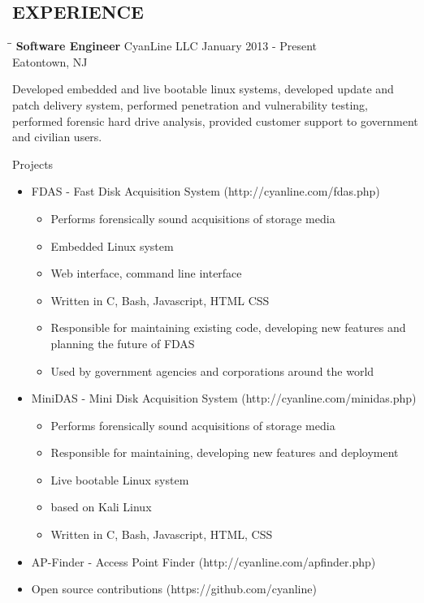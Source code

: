 \documentclass{res}
\begin{document}
\begin{resume}
\section{EXPERIENCE}
   \vspace{-0.1in}	
   \begin{tabbing}
   \hspace{2.3in}\= \hspace{2.6in}\= \kill %
    {\bf Software Engineer} \>CyanLine LLC     \>January 2013 - Present\\
                             \>Eatontown, NJ
   \end{tabbing}\vspace{-20pt}      %
    Developed embedded and live bootable linux systems, 
    developed update and patch delivery system,
    performed penetration and vulnerability testing,
    performed forensic hard drive analysis,
    provided customer support to government and civilian users.

    Projects
    \begin{itemize}
        \item FDAS - Fast Disk Acquisition System (http://cyanline.com/fdas.php)
        \begin{itemize}
            \item Performs forensically sound acquisitions of storage media
            \item Embedded Linux system
            \item Web interface, command line interface
            \item Written in C, Bash, Javascript, HTML CSS
            \item Responsible for maintaining existing code, developing new features and planning the future of FDAS
            \item Used by government agencies and corporations around the world
        \end{itemize}
        \item MiniDAS - Mini Disk Acquisition System (http://cyanline.com/minidas.php)
        \begin{itemize}
            \item Performs forensically sound acquisitions of storage media
            \item Responsible for maintaining, developing new features and deployment
            \item Live bootable Linux system
            \item based on Kali Linux
            \item Written in C, Bash, Javascript, HTML, CSS
        \end{itemize}
        \item AP-Finder - Access Point Finder (http://cyanline.com/apfinder.php)
        \item Open source contributions (https://github.com/cyanline)
    \end{itemize}



\end{resume}
\end{document}
